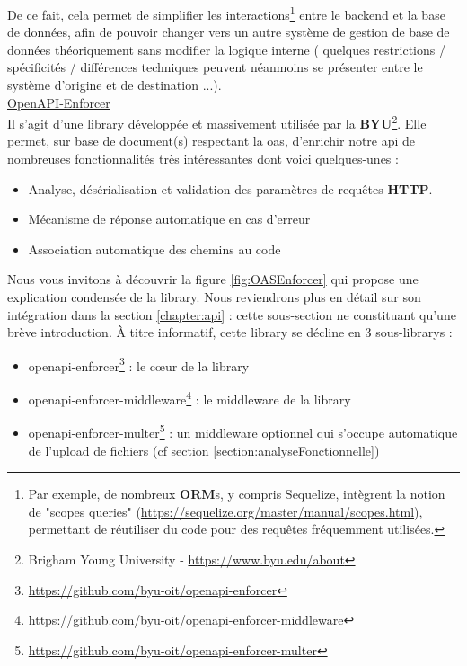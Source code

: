 De ce fait, cela permet de simplifier les interactions\footnote{
    Par exemple, de nombreux \textbf{ORM}s, y compris Sequelize, intègrent la notion de "scopes queries" (\url{https://sequelize.org/master/manual/scopes.html}), permettant de réutiliser du code pour des requêtes fréquemment utilisées.
} entre le \gls{backend} et la base de données, afin de pouvoir changer vers un autre système de gestion de base de données théoriquement sans modifier la logique interne (
quelques restrictions / spécificités / différences techniques peuvent néanmoins se présenter entre le système d'origine et de destination ...). \\

\noindent\underline{OpenAPI-Enforcer}\\

Il s'agit d'une \gls{library} développée et massivement utilisée par la \textbf{BYU}\footnote{
    Brigham Young University - \url{https://www.byu.edu/about}
}. 
Elle permet, sur base de document(s) respectant la \Gls{oas}, d'enrichir notre \Gls{api} de nombreuses fonctionnalités très intéressantes dont voici quelques-unes :

\begin{itemize}[nosep,noitemsep,topsep=0pt,partopsep=0pt,after=\vspace*{2pt}]
    \item Analyse, désérialisation et validation des paramètres de requêtes \textbf{HTTP}.
    \item Mécanisme de réponse automatique en cas d'erreur
    \item Association automatique des chemins au code
\end{itemize}

Nous vous invitons à découvrir la figure \ref{fig:OASEnforcer} qui propose une explication condensée de la \gls{library}.
Nous reviendrons plus en détail sur son intégration dans la section \ref{chapter:api} : cette sous-section ne constituant qu'une brève introduction.
À titre informatif, cette \gls{library} se décline en 3 sous-\glspl{library} :

\begin{itemize}[nosep,noitemsep,topsep=0pt,partopsep=0pt,after=\vspace*{2pt}]
    \item openapi-enforcer\footnote{
        \url{https://github.com/byu-oit/openapi-enforcer}
    } : le cœur de la \gls{library}
    \item openapi-enforcer-middleware\footnote{
        \url{https://github.com/byu-oit/openapi-enforcer-middleware}
    } : le \gls{middleware} de la \gls{library}
    \item openapi-enforcer-multer\footnote{
        \url{https://github.com/byu-oit/openapi-enforcer-multer}
    } : un \gls{middleware} optionnel qui s'occupe automatique de l'upload de fichiers (cf section \ref{section:analyseFonctionnelle})
\end{itemize}

